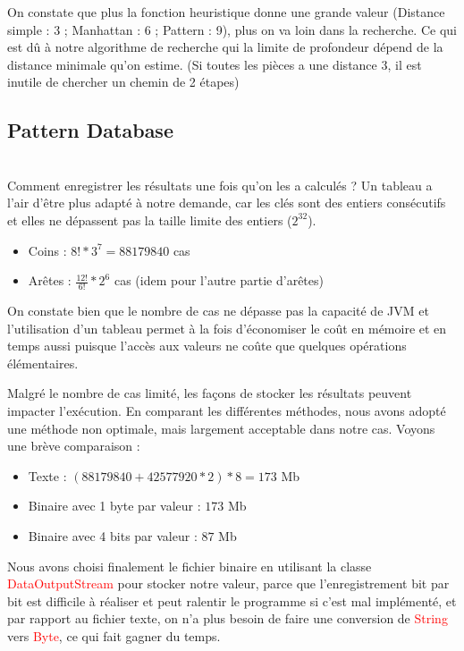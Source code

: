 \documentclass[fleqn,10pt,french]{SelfArx} %
\newcommand{\class}[1]{\colorbox{bg}{\textcolor{red}{\usefont{OT1}{cmtt}{m}{n}#1}}}
\begin{document}
\indent
On constate que plus la fonction heuristique donne une grande valeur (Distance simple : 3 ; Manhattan : 6 ; Pattern : 9), plus on va loin dans la recherche. Ce qui est dû à notre algorithme de recherche qui la limite de profondeur dépend de la distance minimale qu’on estime. (Si toutes les pièces a une distance 3, il est inutile de chercher un chemin de 2 étapes)

\subsection{Pattern Database}

~\\\indent
Comment enregistrer les résultats une fois qu’on les a calculés ? Un tableau a l’air d’être plus adapté à notre demande, car les clés sont des entiers consécutifs et elles ne dépassent pas la taille limite des entiers ($2^{32}$).

\begin{itemize}[noitemsep] %
\item Coins :  $8! * 3^7 = 88179840$ cas
\item Arêtes : $\frac{12!}{6!}*2^6$ cas (idem pour l’autre partie d’arêtes)
\end{itemize}

On constate bien que le nombre de cas ne dépasse pas la capacité de JVM et l’utilisation d’un tableau permet à la fois d’économiser le coût en mémoire et en temps aussi puisque l’accès aux valeurs ne coûte que quelques opérations élémentaires. 

Malgré le nombre de cas limité, les façons de stocker les résultats peuvent impacter l’exécution. En comparant les différentes méthodes, nous avons adopté une méthode non optimale, mais largement acceptable dans notre cas. Voyons une brève comparaison :

\begin{itemize}[noitemsep] %
\item Texte :  $(88179840 + 42577920 * 2) * 8 = 173$ Mb
\item Binaire avec 1 byte par valeur : $173$ Mb
\item Binaire avec 4 bits par valeur : $87$ Mb
\end{itemize}

Nous avons choisi finalement le fichier binaire en utilisant la classe \class{DataOutputStream} pour stocker notre valeur, parce que l’enregistrement bit par bit est difficile à réaliser et peut ralentir le programme si c’est mal implémenté, et par rapport au fichier texte, on n’a plus besoin de faire une conversion de \class{String} vers \class{Byte}, ce qui fait gagner du temps. 
\end{document}
